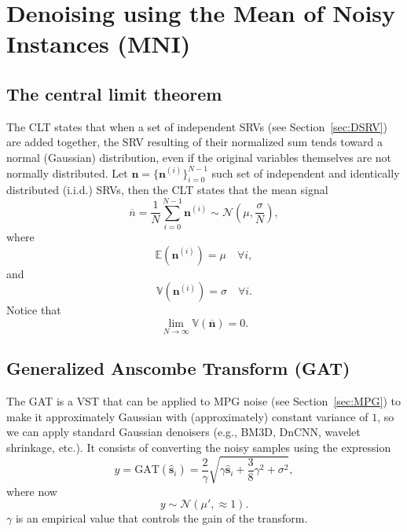 \chapter{Denoising using the Mean of Noisy Instances (MNI)}

\section{The central limit theorem}
\label{sec:CLT}

The \gls{CLT} states that when a set of independent \glspl{SRV} (see
Section~\ref{sec:DSRV}) are added together, the \gls{SRV} resulting of their normalized sum tends
toward a normal (Gaussian) distribution, even if the original
variables themselves are not normally distributed. Let
$\mathbf{n}=\{\mathbf{n}^{(i)}\}_{i=0}^{N-1}$ such set of independent and
identically distributed (i.i.d.) \glspl{SRV}, then the \gls{CLT} states that the mean signal
\begin{equation}
  \overline{n} = \frac{1}{N}\sum_{i=0}^{N-1}\mathbf{n}^{(i)}\sim\mathcal{N}(\mu,\frac{\sigma}{N}),
\end{equation}
where
\begin{equation}
  \mathbb{E}(\mathbf{n}^{(i)})=\mu\quad\forall i,
\end{equation}
and
\begin{equation}
  \mathbb{V}(\mathbf{n}^{(i)})=\sigma\quad\forall i.
\end{equation}
Notice that
\begin{equation}
  \lim_{N\rightarrow\infty}\mathbb{V}(\overline{\mathbf{n}}) = 0.
\end{equation}


\section{Generalized Anscombe Transform (GAT)}
The \gls{GAT} \cite{foi2008practical,makitalo2012optimal} is a
\gls{VST} that can be applied to \gls{MPG} noise (see
Section~\ref{sec:MPG}) to make it approximately Gaussian with
(approximately) constant variance of $1$, so we can apply standard
Gaussian denoisers (e.g., BM3D, DnCNN, wavelet shrinkage, etc.). It
consists of converting the noisy samples using the expression
\begin{equation}
  y = \text{GAT}(\hat{\mathbf{s}}_i)=\frac{2}{\gamma}\sqrt{\gamma\hat{\mathbf{s}}_i+\frac{3}{8}\gamma^2+\sigma^2},
\end{equation}
where now
\begin{equation}
  y\sim\mathcal{N}(\mu',\approx 1).
\end{equation}
$\gamma$ is an empirical value that controls the gain of the transform.


